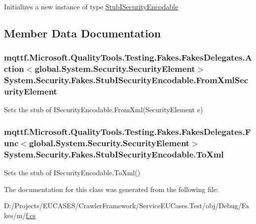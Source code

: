 Initializes a new instance of type \hyperlink{class_system_1_1_security_1_1_fakes_1_1_stub_i_security_encodable}{Stub\-I\-Security\-Encodable}



\subsection{Member Data Documentation}
\hypertarget{class_system_1_1_security_1_1_fakes_1_1_stub_i_security_encodable_afea20972e96c24da49b9d6ee6f4751ca}{
\subsubsection[{From\-Xml\-Security\-Element}]{\setlength{\rightskip}{0pt plus 5cm}mqttf.\-Microsoft.\-Quality\-Tools.\-Testing.\-Fakes.\-Fakes\-Delegates.\-Action$<$global.\-System.\-Security.\-Security\-Element$>$ System.\-Security.\-Fakes.\-Stub\-I\-Security\-Encodable.\-From\-Xml\-Security\-Element}}\label{class_system_1_1_security_1_1_fakes_1_1_stub_i_security_encodable_afea20972e96c24da49b9d6ee6f4751ca}


Sets the stub of I\-Security\-Encodable.\-From\-Xml(\-Security\-Element e)

\hypertarget{class_system_1_1_security_1_1_fakes_1_1_stub_i_security_encodable_a806b72ae667610c95f7532123ded4836}{
\subsubsection[{To\-Xml}]{\setlength{\rightskip}{0pt plus 5cm}mqttf.\-Microsoft.\-Quality\-Tools.\-Testing.\-Fakes.\-Fakes\-Delegates.\-Func$<$global.\-System.\-Security.\-Security\-Element$>$ System.\-Security.\-Fakes.\-Stub\-I\-Security\-Encodable.\-To\-Xml}}\label{class_system_1_1_security_1_1_fakes_1_1_stub_i_security_encodable_a806b72ae667610c95f7532123ded4836}


Sets the stub of I\-Security\-Encodable.\-To\-Xml()



The documentation for this class was generated from the following file\-:\begin{DoxyCompactItemize}
\item 
D\-:/\-Projects/\-E\-U\-C\-A\-S\-E\-S/\-Crawler\-Framework/\-Service\-E\-U\-Cases.\-Test/obj/\-Debug/\-Fakes/m/\hyperlink{m_2f_8cs}{f.\-cs}\end{DoxyCompactItemize}
